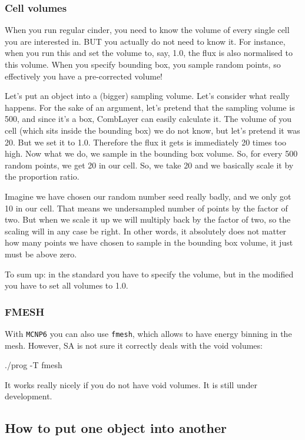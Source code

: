 \subsubsection{Cell volumes}
When you run regular cinder, you need to know the volume of every single cell you are interested in.
BUT you actually do not need to know it.
For instance, when you run this and set the volume to, say, 1.0, the flux is also normalised to this volume.
When you specify bounding box, you sample random points, so effectively you have a pre-corrected volume!

Let's put an object into a (bigger) sampling volume. Let's consider what really happens.
For the sake of an argument, let's pretend that the sampling volume is 500, and since it's a box, CombLayer can easily calculate it.
The volume of you cell (which sits inside the bounding box) we do not know, but let's pretend it was 20.
But we set it to 1.0. Therefore the flux it gets is immediately 20 times too high.
Now what we do, we sample in the bounding box volume. So, for every 500 random points, we get 20 in our cell.
So, we take 20 and we basically scale it by the proportion ratio.

Imagine we have chosen our random number seed really badly, and we only got 10 in our cell. That means we undersampled number of points by the factor of two.
But when we scale it up we will multiply back by the factor of two, so the scaling will in any case be right.
In other words, it absolutely does not matter how many points we have chosen to sample in the bounding box volume, it just must be above zero.

To sum up: in the standard \cinder you have to specify the volume, but in the modified \cinder you have to set all volumes to 1.0.

\subsubsection{FMESH}
With {\tt MCNP6} you can also use {\tt fmesh}, which allows to have energy binning in the mesh. However, SA is not sure it correctly deals with the void volumes:
\begin{bash}
./prog -T fmesh
\end{bash}
It works really nicely if you do not have void volumes. It is still under development.


\subsection{How to put one object into another}

